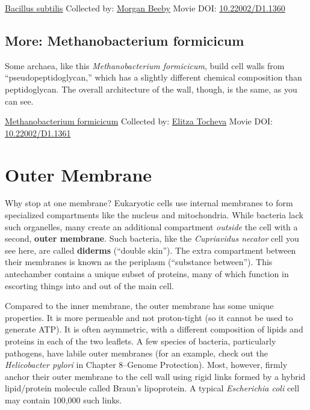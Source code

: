 \documentclass[]{tufte-book}
\begin{document}
\hypertarget{htmlwidget-5fc7733c38e30244163d}{}

\label{fig:2-2a}\protect\hyperlink{tree}{Bacillus subtilis} Collected by: \protect\hyperlink{morgan_beeby}{Morgan Beeby} Movie DOI: \href{https://doi.org/10.22002/D1.1360}{10.22002/D1.1360}

\hypertarget{Methanobacterium_formicicum}{%
\subsection*{More: Methanobacterium formicicum}\label{Methanobacterium_formicicum}}

Some archaea, like this \emph{Methanobacterium formicicum}, build cell walls from ``pseudopeptidoglycan,'' which has a slightly different chemical composition than peptidoglycan. The overall architecture of the wall, though, is the same, as you can see.



\hypertarget{htmlwidget-34e4ba327756acc6cfd8}{}

\label{fig:2-2b}\protect\hyperlink{tree}{Methanobacterium formicicum} Collected by: \protect\hyperlink{elitza_tocheva}{Elitza Tocheva} Movie DOI: \href{https://doi.org/10.22002/D1.1361}{10.22002/D1.1361}

\hypertarget{outer-membrane}{%
\section{Outer Membrane}\label{outer-membrane}}

Why stop at one membrane? Eukaryotic cells use internal membranes to form specialized compartments like the nucleus and mitochondria. While bacteria lack such organelles, many create an additional compartment \emph{outside} the cell with a second, \textbf{outer membrane}. Such bacteria, like the \emph{Cupriavidus necator} cell you see here, are called \textbf{diderms} (``double skin''). The extra compartment between their membranes is known as the periplasm (``substance between''). This antechamber contains a unique subset of proteins, many of which function in escorting things into and out of the main cell.

Compared to the inner membrane, the outer membrane has some unique properties. It is more permeable and not proton-tight (so it cannot be used to generate ATP). It is often asymmetric, with a different composition of lipids and proteins in each of the two leaflets. A few species of bacteria, particularly pathogens, have labile outer membranes (for an example, check out the \emph{Helicobacter pylori} in Chapter 8--Genome Protection). Most, however, firmly anchor their outer membrane to the cell wall using rigid links formed by a hybrid lipid/protein molecule called Braun's lipoprotein. A typical \emph{Escherichia coli} cell may contain 100,000 such links.
\end{document}
